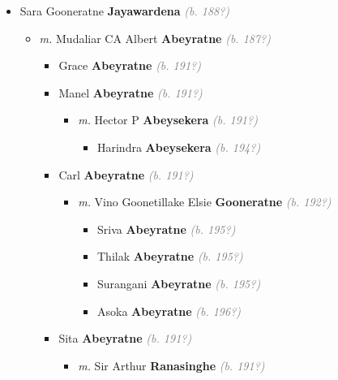 \documentclass[10pt, openany]{book}
\begin{document}
\begin{itemize}
{\begin{itemize}
{   }
\item{Sara Gooneratne \textbf{Jayawardena} \textcolor{gray}{\textit{(b. 188?)}}
\begin{itemize}
\item{\textit{m.} Mudaliar CA Albert \textbf{Abeyratne} \textcolor{gray}{\textit{(b. 187?)}}   \label{couple:00003151:00003152} \begin{itemize}
\item{Grace  \textbf{Abeyratne} \textcolor{gray}{\textit{(b. 191?)}}
 }
\item{Manel  \textbf{Abeyratne} \textcolor{gray}{\textit{(b. 191?)}}
\begin{itemize}
\item{\textit{m.} Hector P \textbf{Abeysekera} \textcolor{gray}{\textit{(b. 191?)}}   \label{couple:00003153:00003154} \begin{itemize}
\item{Harindra \textbf{Abeysekera} \textcolor{gray}{\textit{(b. 194?)}}
 }
\end{itemize}}
\end{itemize}
 }
\item{Carl  \textbf{Abeyratne} \textcolor{gray}{\textit{(b. 191?)}}
\begin{itemize}
\item{\textit{m.} Vino Goonetillake Elsie \textbf{Gooneratne} \textcolor{gray}{\textit{(b. 192?)}}   \label{couple:00003156:00003157} \begin{itemize}
\item{Sriva  \textbf{Abeyratne} \textcolor{gray}{\textit{(b. 195?)}}
 }
\item{Thilak  \textbf{Abeyratne} \textcolor{gray}{\textit{(b. 195?)}}
 }
\item{Surangani \textbf{Abeyratne} \textcolor{gray}{\textit{(b. 195?)}}
 }
\item{Asoka  \textbf{Abeyratne} \textcolor{gray}{\textit{(b. 196?)}}
 }
\end{itemize}}
\end{itemize}
 }
\item{Sita  \textbf{Abeyratne} \textcolor{gray}{\textit{(b. 191?)}}
\begin{itemize}
\item{\textit{m.} Sir Arthur \textbf{Ranasinghe} \textcolor{gray}{\textit{(b. 191?)}}   \label{couple:00003165:00003166} \begin{itemize}

\end{itemize}}
\end{itemize}}
\end{itemize}}
\end{itemize}}
\end{itemize}}
\end{itemize}
\end{document}
